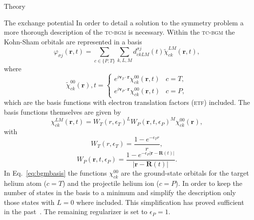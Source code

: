 \documentclass[aps, pra, reprint, groupedaddress, amsfonts,
               amsmath, amssymb, showpacs, nofootinbib]{revtex4-1}
\begin{document}
\begin{section}{Theory \label{sec:theory}}
\begin{subsection}{The exchange potential \label{sec:xpot}}
      In order to detail a solution to the symmetry problem a more thorough description of the
      \textsc{tc-bgm} is necessary. Within the \textsc{tc-bgm} the Kohn-Sham orbitals are represented in
      a basis
      \begin{equation} \label{eq:bgmexp}
         \varphi_{\sigma j}(\mathbf{r},t) = \sum\limits_{c \in \{P, T\}} \sum\limits_{k, L, M}
                               d_{c k L M}^{\sigma j}(t) \tilde{\chi}^{LM}_{c k}(\mathbf{r},t),
      \end{equation}
      where
      \begin{equation} \label{eq:etfbasis}
         \tilde{\chi}^{00}_{ck}(\mathbf{r}),t =
            \begin{cases}
               e^{i \mathbf{v}_T \cdot \mathbf{r}} {\chi}^{00}_{c k}(\mathbf{r},t) & c = T, \\[2ex]
               e^{i \mathbf{v}_P \cdot \mathbf{r}} {\chi}^{00}_{c k}(\mathbf{r},t) & c = P,
            \end{cases}
      \end{equation}
      which are the basis functions with electron translation factors (\textsc{etf}) included. The basis
      functions themselves are given by
      \begin{equation} \label{eq:bgmbasis}
         \chi^{LM}_{ck} (\mathbf{r},t)
         = W_T(r,\epsilon_T)^L W_P( \mathbf{r},t, \epsilon_P)^M \chi^{00}_{ck} (\mathbf{r}),
      \end{equation}
      with
      \begin{equation}
         W_T(r,\epsilon_T) = \frac{1 - e^{-\epsilon_T r}}{r},
      \end{equation}
      \begin{equation}
         W_P (\mathbf{r},t,\epsilon_P)
         = \frac{1 - e^{-\epsilon_P|\mathbf{r} - \mathbf{R}(t)|}}{|\mathbf{r} - \mathbf{R}(t)|}.
      \end{equation}
      In Eq.~\eqref{eq:bgmbasis} the functions $\chi^{00}_{ck}$ are the ground-state orbitals for the
      target helium atom ($c = T$) and the projectile helium ion ($c = P$).  In order to keep the number
      of states in the basis to a minimum and simplify the description only those states with $L = 0$
      where included. This simplification has proved sufficient in the past~\cite{bgm-rev}. The
      remaining regularizer is set to $\epsilon_P = 1$.

   \end{subsection}

\end{section}
\end{document}
